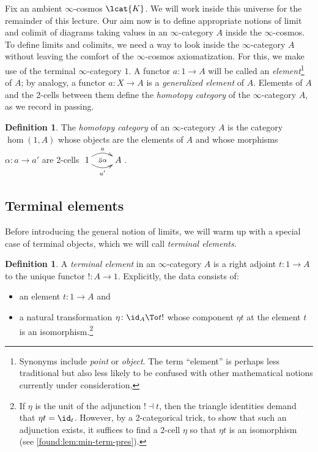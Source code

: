 \documentclass[12pt,reqno]{amsart}
\theoremstyle{plain}
\theoremstyle{definition}
\newtheorem{defn}[thm]{Definition}
\theoremstyle{remark}
\numberwithin{equation}{subsection}
\newcommand{\extRef}[3]{%
  {\protect\IfBeginWith{#3}{itm:}{}{#2.}}\ref*{#1:#3}}
\newcommand{\refI}{\extRef{found}{I}}
\begin{document}
Fix an ambient $\infty$-cosmos $\lcat{K}$. We will work inside this universe for the remainder of this lecture. Our aim now is to define appropriate notions of limit and colimit of diagrams taking values in an $\infty$-category $A$ inside the $\infty$-cosmos. To define limits and colimits, we need a way to look inside the $\infty$-category $A$ without leaving the comfort of the $\infty$-cosmos axiomatization. For this, we make use of the terminal $\infty$-category $1$. A functor $a \colon 1\to A$ will be called an \emph{element}\footnote{Synonyms include \emph{point} or \emph{object}. The term ``element'' is perhaps less traditional but also less likely to be confused with other mathematical notions currently under consideration.} of $A$; by analogy, a functor $a \colon X \to A$ is a \emph{generalized element} of $A$. Elements of $A$ and the 2-cells between them define the \emph{homotopy category} of the $\infty$-category $A$, as we record in passing.

\begin{defn}\label{defn:homotopy-category}
The \emph{homotopy category}  of an $\infty$-category $A$ is the category $\hom(1,A)$ whose objects are the elements of $A$ and whose morphisms $\alpha \colon a \to a'$ are 2-cells $\xymatrix{ 1 \ar@/^2ex/[r]^a \ar@/_2ex/[r]_{a'} \ar@{}[r]|{\Downarrow \alpha} &A}$.
\end{defn}


\subsection{Terminal elements}


Before introducing the general notion of limits, we will warm up with a special case of terminal objects, which we will call \emph{terminal elements}.

\begin{defn}\label{defn:terminal-element} A \emph{terminal element} in an $\infty$-category $A$ is a right adjoint $t \colon 1 \to A$ to the unique functor $! \colon A \to 1$. Explicitly, the data consists of:
\begin{itemize}
\item an element $t \colon 1 \to A$ and
\item a natural transformation $\eta \colon \id_A \To t!$ whose component $\eta t$ at the element $t$ is an isomorphism.\footnote{If $\eta$ is the unit of the adjunction $! \dashv t$, then the triangle identities demand that $\eta t =\id_t$.  However, by a 2-categorical trick, to show that such an adjunction exists, it suffices to find a 2-cell $\eta$ so that $\eta t$ is an isomorphism (see \refI{lem:min-term-pres}).}
\end{itemize}
\end{defn}
\end{document}
